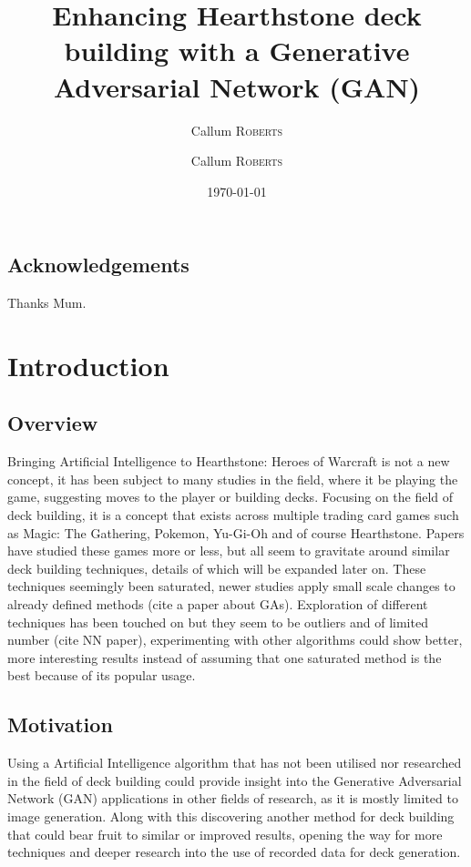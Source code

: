 \documentclass{report} %
\title{Enhancing Hearthstone deck building with a Generative Adversarial Network (GAN)} %
\author{Callum \textsc{Roberts}} %
\author{Callum \textsc{Roberts}} %
\date{\today} %
\begin{document}
\maketitle %


\begin{abstract}

\end{abstract}

\section*{Acknowledgements}
Thanks Mum.

\tableofcontents

\chapter{Introduction}
\section{Overview}
Bringing Artificial Intelligence to Hearthstone: Heroes of Warcraft is not a new concept, it has been subject to many studies in the field, where it be playing the game, suggesting moves to the player or building decks. Focusing on the field of deck building, it is a concept that exists across multiple trading card games such as Magic: The Gathering, Pokemon, Yu-Gi-Oh and of course Hearthstone. Papers have studied these games more or less, but all seem to gravitate around similar deck building techniques, details of which will be expanded later on. These techniques seemingly been saturated, newer studies apply small scale changes to already defined methods (cite a paper about GAs). Exploration of different techniques has been touched on but they seem to be outliers and of limited number (cite NN paper), experimenting with other algorithms could show better, more  interesting results instead of assuming that one saturated method is the best because of its popular usage.
\section{Motivation}
Using a Artificial Intelligence algorithm that has not been utilised nor researched in the field of deck building could provide insight into the Generative Adversarial Network (GAN) applications in other fields of research, as it is mostly limited to image generation. Along with this discovering another method for deck building that could bear fruit to similar or improved results, opening the way for more techniques and deeper research into the use of recorded data for deck generation. 
\end{document}

